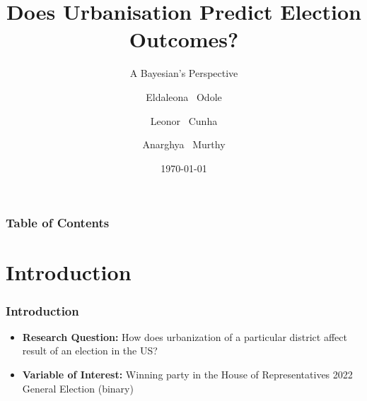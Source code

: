\documentclass{beamer}
\begin{document}
\title[About Beamer] %
{Does Urbanisation Predict Election Outcomes?}

\subtitle{A Bayesian's Perspective}

\author[Odole, Cunha, Murthy] %
{Eldaleona ~Odole \and Leonor ~Cunha \and Anarghya ~Murthy }


\date{\today} %






\frame{\titlepage}

\begin{frame}
\frametitle{Table of Contents}
\tableofcontents
\end{frame}

\section{Introduction}

\begin{frame}
\frametitle{Introduction}
\begin{itemize}
  \item \textbf{Research Question:}
  How does urbanization of a particular district affect result of an election in the US? 
  \item \textbf{Variable of Interest:}
  Winning party in the  House of Representatives 2022 General Election (binary)
\end{itemize}
\end{frame}
\end{document}
